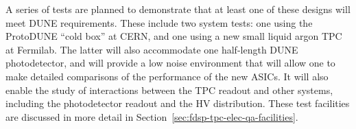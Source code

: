 A series of tests are planned to demonstrate that at least one of these designs will meet DUNE requirements. These include two system tests: one using the ProtoDUNE ``cold box'' at CERN, and one using a new small liquid argon TPC at Fermilab. The latter will also accommodate one half-length DUNE photodetector, and will provide a low noise environment that will allow one to make detailed comparisons of the performance of the new ASICs. It will also enable the study of interactions between the TPC readout and other systems, including the photodetector readout and the HV distribution.  These test facilities are discussed in more detail in Section~\ref{sec:fdsp-tpc-elec-qa-facilities}.
